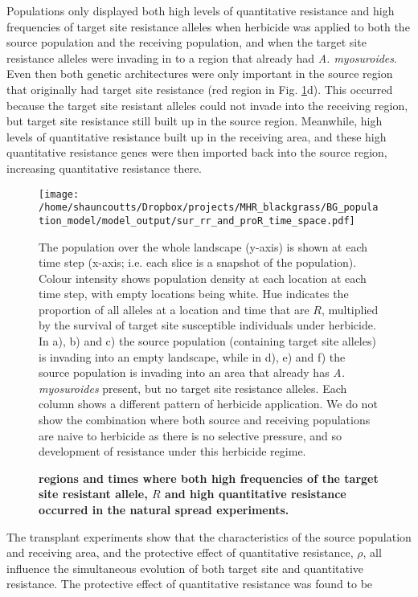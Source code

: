 \documentclass[10pt,letterpaper]{article}
\begin{document}
Populations only displayed both high levels of quantitative resistance and high frequencies of target site resistance alleles when herbicide was applied to both the source population and the receiving population, and when the target site resistance alleles were invading in to a region that already had \textit{A. myosuroides}. Even then both genetic architectures were only important in the source region that originally had target site resistance (red region in Fig. \ref{fig:both_natspr}d). This occurred because the target site resistant alleles could not invade into the receiving region, but target site resistance still built up in the source region. Meanwhile, high levels of quantitative resistance built up in the receiving area, and these high quantitative resistance genes were then imported back into the source region, increasing quantitative resistance there.        

\begin{figure}[!h] 
	\texttt{[image: /home/shauncoutts/Dropbox/projects/MHR\_blackgrass/BG\_population\_model/model\_output/sur\_rr\_and\_proR\_time\_space.pdf]}
\caption{\bf regions and times where both high frequencies of the target site resistant allele, $R$ and high quantitative resistance occurred in the natural spread experiments.} The population over the whole landscape (y-axis) is shown at each time step (x-axis; i.e. each slice is a snapshot of the population).  Colour intensity shows population density at each location at each time step, with empty locations being white. Hue indicates the proportion of all alleles at a location and time that are $R$, multiplied by the survival of target site susceptible individuals under herbicide. In a), b) and c) the source population (containing target site alleles) is invading into an empty landscape, while in d), e) and f) the source population is invading into an area that already has \textit{A. myosuroides} present, but no target site resistance alleles. Each column shows a different pattern of herbicide application. We do not show the combination where both source and receiving populations are naive to herbicide as there is no selective pressure, and so development of resistance under this herbicide regime.    
\label{fig:both_natspr}
\end{figure}

The transplant experiments show that the characteristics of the source population and receiving area, and the protective effect of quantitative resistance, $\rho$, all influence the simultaneous evolution of both target site and quantitative resistance. The protective effect of quantitative resistance was found to be 
\end{document}
